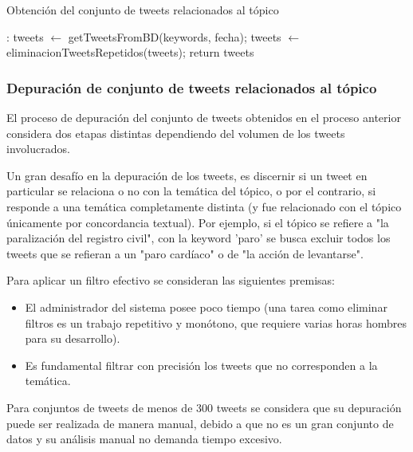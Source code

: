 \begin{algorithm}[H]
	\caption{Obtención del conjunto de tweets relacionados al tópico}\label{getTweetsKeyword}
	\begin{algorithmic}[1]
		
		:
		\State tweets $\gets$ getTweetsFromBD(keywords, fecha);
		\State tweets $\gets$ eliminacionTweetsRepetidos(tweets);
		\State return tweets
		\EndFunction
	\end{algorithmic}
\end{algorithm}	



\subsubsection{Depuración de conjunto de tweets relacionados al tópico}

El proceso de depuración del conjunto de tweets obtenidos en el proceso anterior considera dos etapas distintas dependiendo del volumen de los tweets involucrados.

Un gran desafío en la depuración de los tweets, es discernir si un tweet en particular se relaciona o no con la temática del tópico, o por el contrario, si responde a una temática completamente distinta (y fue relacionado con el tópico únicamente por concordancia textual). Por ejemplo, si el tópico se refiere a "la paralización del registro civil", con la keyword 'paro' se busca excluir todos los tweets que se refieran a un "paro cardíaco" o de "la acción de levantarse".

Para aplicar un filtro efectivo se consideran las siguientes premisas:
\begin{itemize}
	\item El administrador del sistema posee poco tiempo (una tarea como eliminar filtros es un trabajo repetitivo y monótono, que requiere varias horas hombres para su desarrollo).
	\item Es fundamental filtrar con precisión los tweets que no corresponden a la temática.
\end{itemize}

Para conjuntos de tweets de menos de 300 tweets se considera que su depuración puede ser realizada de manera manual, debido a que no es un gran conjunto de datos y su análisis manual no demanda tiempo excesivo.

